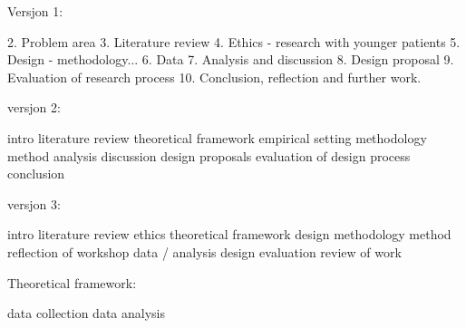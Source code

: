 Versjon 1:

2. Problem area
3. Literature review
4. Ethics - research with younger patients
5. Design - methodology...
6. Data
7. Analysis and discussion
8. Design proposal
9. Evaluation of research process
10. Conclusion, reflection and further work. 

versjon 2:

intro
literature review
theoretical framework
empirical setting
methodology
method
analysis discussion
design proposals
evaluation of design process
conclusion

versjon 3:

intro
literature review
ethics
theoretical framework
design methodology
method
reflection of workshop
data / analysis
design
evaluation
review of work

Theoretical framework:

data collection
data analysis